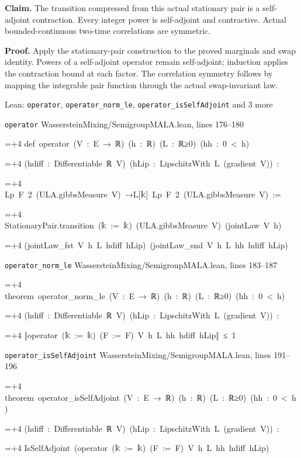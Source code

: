 \documentclass[11pt,a4paper]{report}
\newlength{\leancharwidth}
\newenvironment{leancode}{\par\smallskip\begingroup\ttfamily\footnotesize\raggedright
  \settowidth{\leancharwidth}{M}\setlength{\parskip}{0pt}\setlength{\parindent}{0pt}
  \frenchspacing}{\par\endgroup\smallskip}
\newcommand{\leanline}[2]{\hangindent=\dimexpr#1\leancharwidth+4\leancharwidth\relax
  \hangafter=1\noindent\hspace*{#1\leancharwidth}#2\par}
\newcommand{\leansource}[1]{\par{\footnotesize\color{leanmuted}#1}\par}
\begin{document}
\textbf{Claim.} The transition compressed from this actual stationary pair is a self-adjoint contraction. Every integer power is self-adjoint and contractive. Actual bounded-continuous two-time correlations are symmetric.



\textbf{Proof.} Apply the stationary-pair construction to the proved marginals and swap identity. Powers of a self-adjoint operator remain self-adjoint; induction applies the contraction bound at each factor. The correlation symmetry follows by mapping the integrable pair function through the actual swap-invariant law.

\begin{leanbox}{Lean: \texttt{operator}, \texttt{operator\_\allowbreak{}norm\_\allowbreak{}le}, \texttt{operator\_\allowbreak{}isSelfAdjoint} and 3 more}
\leansource{\texttt{operator} \quad WassersteinMixing/\allowbreak{}SemigroupMALA.lean, lines 176–180}
\begin{leancode}
\leanline{0}{def\ operator\ (V\ :\ E\ →\ ℝ)\ (h\ :\ ℝ)\ (L\ :\ ℝ≥0)\ (hh\ :\ 0\ <\ h)}
\leanline{4}{(hdiff\ :\ Differentiable\ ℝ\ V)\ (hLip\ :\ LipschitzWith\ L\ (gradient\ V))\ :}
\leanline{4}{Lp\ F\ 2\ (ULA.gibbsMeasure\ V)\ →L[{\leanfallback 𝕜}]\ Lp\ F\ 2\ (ULA.gibbsMeasure\ V)\ :=}
\leanline{2}{StationaryPair.transition\ ({\leanfallback 𝕜}\ :=\ {\leanfallback 𝕜})\ (ULA.gibbsMeasure\ V)\ (jointLaw\ V\ h)}
\leanline{4}{(jointLaw\_fst\ V\ h\ L\ hdiff\ hLip)\ (jointLaw\_snd\ V\ h\ L\ hh\ hdiff\ hLip)}
\end{leancode}
\leansource{\texttt{operator\_\allowbreak{}norm\_\allowbreak{}le} \quad WassersteinMixing/\allowbreak{}SemigroupMALA.lean, lines 183–187}
\begin{leancode}
\leanline{0}{theorem\ operator\_norm\_le\ (V\ :\ E\ →\ ℝ)\ (h\ :\ ℝ)\ (L\ :\ ℝ≥0)\ (hh\ :\ 0\ <\ h)}
\leanline{4}{(hdiff\ :\ Differentiable\ ℝ\ V)\ (hLip\ :\ LipschitzWith\ L\ (gradient\ V))\ :}
\leanline{4}{‖operator\ ({\leanfallback 𝕜}\ :=\ {\leanfallback 𝕜})\ (F\ :=\ F)\ V\ h\ L\ hh\ hdiff\ hLip‖\ ≤\ 1}
\end{leancode}
\leansource{\texttt{operator\_\allowbreak{}isSelfAdjoint} \quad WassersteinMixing/\allowbreak{}SemigroupMALA.lean, lines 191–196}
\begin{leancode}
\leanline{0}{theorem\ operator\_isSelfAdjoint\ (V\ :\ E\ →\ ℝ)\ (h\ :\ ℝ)\ (L\ :\ ℝ≥0)\ (hh\ :\ 0\ <\ h)}
\leanline{4}{(hdiff\ :\ Differentiable\ ℝ\ V)\ (hLip\ :\ LipschitzWith\ L\ (gradient\ V))\ :}
\leanline{4}{IsSelfAdjoint\ (operator\ ({\leanfallback 𝕜}\ :=\ {\leanfallback 𝕜})\ (F\ :=\ F)\ V\ h\ L\ hh\ hdiff\ hLip)}

\end{leancode}
\end{leanbox}
\end{document}
